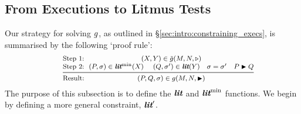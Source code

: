 \subsection{From Executions to Litmus Tests}
\label{sec:lits}

Our strategy for solving $g$, as outlined in \S\ref{sec:intro:constraining_execs}, is summarised by the
following `proof rule':
%
\begin{equation}
\label{eq:proof_rule}
\raisebox{1.5mm}{\small\begin{tabular}{@{}l@{~~}c@{}}
Step 1: & $(X,Y)\in \GeneralExec(M,N,\triangleright)$
\\
Step 2: & 
$(P,\sigma) \in \litmax(X) ~~~~ (Q,\sigma') \in \lit(Y) ~~~
\sigma=\sigma' ~~~ P \blacktriangleright Q$
\\ \midrule
\rlap{Result:} & $(P,Q,\sigma)\in \GeneralProg(M,N,\blacktriangleright)$
\end{tabular}}
\end{equation}
%
The purpose of this subsection is to define the $\textbf{\itshape lit}$ and $\textbf{\itshape lit}^{\rm min}$
functions. We begin by defining a more general constraint, $\textbf{\itshape lit}'$.


